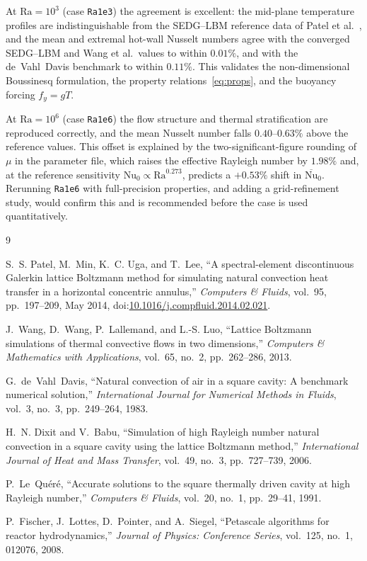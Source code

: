 \documentclass[11pt,a4paper]{article}
\begin{document}
At $\mathrm{Ra}=10^{3}$ (case \texttt{Ra1e3}) the agreement is excellent: the
mid-plane temperature profiles are indistinguishable from the SEDG--LBM
reference data of Patel et al.~\cite{patel2014}, and the mean and extremal
hot-wall Nusselt numbers agree with the converged SEDG--LBM and Wang et al.\
values to within $0.01\%$, and with the de~Vahl~Davis benchmark to within
$0.11\%$. This validates the non-dimensional Boussinesq formulation, the
property relations~\eqref{eq:props}, and the buoyancy forcing $f_y = gT$.

At $\mathrm{Ra}=10^{6}$ (case \texttt{Ra1e6}) the flow structure and thermal
stratification are reproduced correctly, and the mean Nusselt number falls
$0.40$--$0.63\%$ above the reference values. This offset is explained by the
two-significant-figure rounding of $\mu$ in the parameter file, which raises the
effective Rayleigh number by $1.98\%$ and, at the reference sensitivity
$\mathrm{Nu}_0\propto\mathrm{Ra}^{0.273}$, predicts a $+0.53\%$ shift in
$\overline{\mathrm{Nu}}_0$. Rerunning \texttt{Ra1e6} with full-precision
properties, and adding a grid-refinement study, would confirm this and is
recommended before the case is used quantitatively.

\begin{thebibliography}{9}

S.~S. Patel, M.~Min, K.~C. Uga, and T.~Lee,
``A spectral-element discontinuous Galerkin lattice Boltzmann method for
simulating natural convection heat transfer in a horizontal concentric
annulus,'' \emph{Computers \& Fluids}, vol.~95, pp.~197--209, May 2014,
doi:\href{https://doi.org/10.1016/j.compfluid.2014.02.021}{10.1016/j.compfluid.2014.02.021}.

J.~Wang, D.~Wang, P.~Lallemand, and L.-S. Luo,
``Lattice Boltzmann simulations of thermal convective flows in two
dimensions,'' \emph{Computers \& Mathematics with Applications}, vol.~65,
no.~2, pp.~262--286, 2013.

G.~de~Vahl~Davis,
``Natural convection of air in a square cavity: A benchmark numerical
solution,'' \emph{International Journal for Numerical Methods in Fluids},
vol.~3, no.~3, pp.~249--264, 1983.

H.~N. Dixit and V.~Babu,
``Simulation of high Rayleigh number natural convection in a square cavity
using the lattice Boltzmann method,'' \emph{International Journal of Heat and
Mass Transfer}, vol.~49, no.~3, pp.~727--739, 2006.

P.~Le~Qu\'er\'e,
``Accurate solutions to the square thermally driven cavity at high Rayleigh
number,'' \emph{Computers \& Fluids}, vol.~20, no.~1, pp.~29--41, 1991.

P.~Fischer, J.~Lottes, D.~Pointer, and A.~Siegel,
``Petascale algorithms for reactor hydrodynamics,'' \emph{Journal of Physics:
Conference Series}, vol.~125, no.~1, 012076, 2008.

\end{thebibliography}
\end{document}
